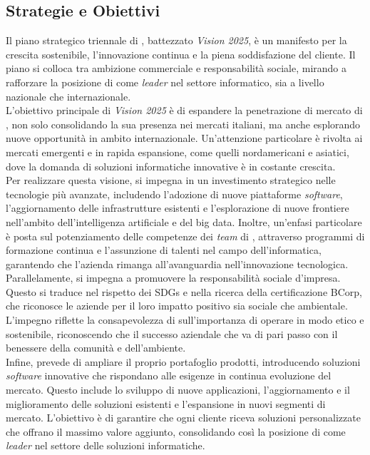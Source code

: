 \subsection{Strategie e Obiettivi}
Il piano strategico triennale di \azienda{}, battezzato \textit{Vision 2025}, è un manifesto per la crescita sostenibile, l'innovazione continua e la piena 
soddisfazione del cliente. Il piano si colloca tra ambizione commerciale e responsabilità sociale, mirando a rafforzare la posizione 
di \azienda{} come \textit{leader}  nel settore informatico, sia a livello nazionale che internazionale. \\ 
L'obiettivo principale di \textit{Vision 2025} è di espandere la penetrazione di mercato di \azienda{}, non solo consolidando la sua presenza nei mercati italiani, 
ma anche esplorando nuove opportunità in ambito internazionale. Un'attenzione particolare è rivolta ai mercati emergenti e in rapida espansione, come quelli 
nordamericani e asiatici, dove la domanda di soluzioni informatiche innovative è in costante crescita. \\ 
Per realizzare questa visione, \azienda{} si impegna in un investimento strategico nelle tecnologie più avanzate,
includendo l'adozione di nuove piattaforme \textit{software}, l'aggiornamento delle infrastrutture esistenti e l'esplorazione 
di nuove frontiere nell'ambito dell'intelligenza artificiale e del big data. Inoltre, un'enfasi particolare è posta sul potenziamento delle competenze dei 
\textit{team} di \azienda{}, attraverso programmi di formazione continua e l'assunzione di talenti nel campo dell'informatica, garantendo che l'azienda rimanga 
all'avanguardia nell'innovazione tecnologica. \\ 
Parallelamente, \azienda{} si impegna a promuovere la responsabilità sociale d'impresa. 
Questo si traduce nel rispetto dei \gls{SDGs} e nella ricerca della certificazione \gls{BCorp}, che riconosce le aziende per il loro impatto positivo 
sia sociale che ambientale. L'impegno riflette la consapevolezza di \azienda{} sull'importanza di operare in modo etico e sostenibile, riconoscendo
 che il successo aziendale che va di pari passo con il benessere della comunità e dell'ambiente. \\ 
 Infine, \azienda{} prevede di ampliare il proprio portafoglio prodotti, introducendo soluzioni \textit{software} innovative che rispondano alle esigenze in continua evoluzione del mercato. 
 Questo include lo sviluppo di nuove applicazioni, l'aggiornamento e il miglioramento delle soluzioni esistenti e l'espansione in nuovi segmenti di mercato. 
 L'obiettivo è di garantire che ogni cliente riceva soluzioni personalizzate che offrano il massimo valore aggiunto, 
 consolidando così la posizione di \azienda{} come \textit{leader}  nel settore delle soluzioni informatiche.

